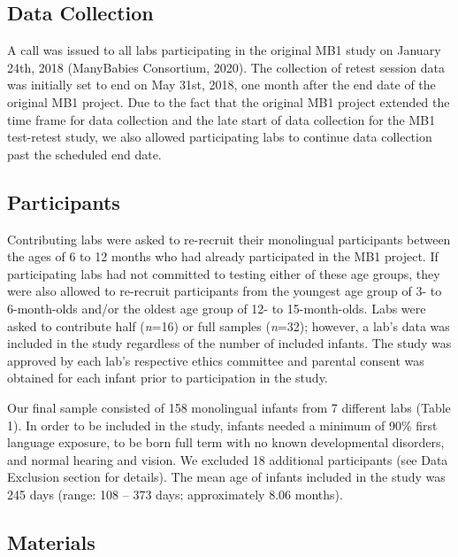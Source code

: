\documentclass[
  man,floatsintext]{apa6}
\begin{document}
\hypertarget{data-collection}{%
\subsection{Data Collection}\label{data-collection}}

A call was issued to all labs participating in the original MB1 study on January 24th, 2018 (ManyBabies Consortium, 2020). The collection of retest session data was initially set to end on May 31st, 2018, one month after the end date of the original MB1 project. Due to the fact that the original MB1 project extended the time frame for data collection and the late start of data collection for the MB1 test-retest study, we also allowed participating labs to continue data collection past the scheduled end date.

\hypertarget{participants}{%
\subsection{Participants}\label{participants}}

Contributing labs were asked to re-recruit their monolingual participants between the ages of 6 to 12 months who had already participated in the MB1 project.
If participating labs had not committed to testing either of these age groups, they were also allowed to re-recruit participants from the youngest age group of 3- to 6-month-olds and/or the oldest age group of 12- to 15-month-olds.
Labs were asked to contribute half (\emph{n}=16) or full samples (\emph{n}=32); however, a lab's data was included in the study regardless of the number of included infants.
The study was approved by each lab's respective ethics committee and parental consent was obtained for each infant prior to participation in the study.

Our final sample consisted of 158 monolingual infants from 7 different labs (Table 1).
In order to be included in the study, infants needed a minimum of 90\% first language exposure, to be born full term with no known developmental disorders, and normal hearing and vision.
We excluded 18 additional participants (see Data Exclusion section for details).
The mean age of infants included in the study was 245 days (range: 108 -- 373 days; approximately 8.06 months).

\hypertarget{materials}{%
\subsection{Materials}\label{materials}}
\end{document}
